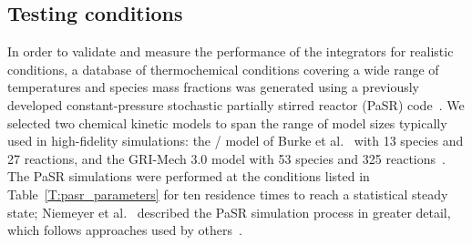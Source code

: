 \documentclass[preprint]{elsarticle}
\begin{document}
\subsection{Testing conditions}
\label{S:pasr_conditions}

In order to validate and measure the performance of the integrators for realistic conditions, a database of thermochemical conditions covering a wide range of temperatures and species mass fractions was generated using a previously developed constant-pressure stochastic partially stirred reactor (PaSR) code~\cite{Niemeyer:2015ws}.
We selected two chemical kinetic models to span the range of model sizes typically used in high-fidelity simulations: the \slash{} model of Burke et al.~\cite{Burke:2011fh} with 13 species and 27 reactions, and the GRI-Mech 3.0 model with 53 species and 325 reactions~\cite{smith_gri-mech_30}.
The PaSR simulations were performed at the conditions listed in Table~\ref{T:pasr_parameters} for ten residence times to reach a statistical steady state; Niemeyer et al.~\cite{Niemeyer:2015ws} described the PaSR simulation process in greater detail, which follows approaches used by others~\cite{Chen:1997ta,Pope:1997wu,Ren:2004fz,Ren:2014cd}.
%
\end{document}
